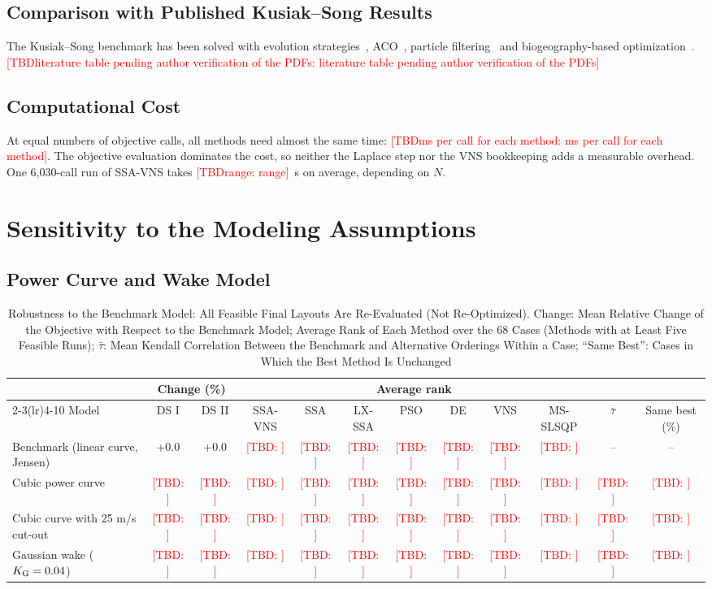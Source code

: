 \documentclass[journal,twoside]{IEEEtran}
\newcommand{\TBD}[1]{\textcolor{red}{[TBD\ifx\relax#1\relax\else: #1\fi]}}
\begin{document}
\subsection{Comparison with Published Kusiak--Song Results}
\label{sec:literature}
The Kusiak--Song benchmark has been solved with evolution strategies~\cite{Kusiak2010}, ACO~\cite{Eroglu2012}, particle filtering~\cite{Eroglu2013} and biogeography-based optimization~\cite{Bansal2017}. \TBD{literature table pending author verification of the PDFs}

\subsection{Computational Cost}
\label{sec:runtime}
At equal numbers of objective calls, all methods need almost the same time: \TBD{ms per call for each method}. The objective evaluation dominates the cost, so neither the Laplace step nor the VNS bookkeeping adds a measurable overhead. One 6,030-call run of SSA-VNS takes \TBD{range}~s on average, depending on $N$.

\section{Sensitivity to the Modeling Assumptions}
\label{sec:robustness}
\subsection{Power Curve and Wake Model}
\label{sec:powercurve}
\label{sec:gaussian}
\begin{table}[!t]
\centering
\caption{Robustness to the Benchmark Model: All Feasible Final Layouts Are Re-Evaluated (Not Re-Optimized). Change: Mean Relative Change of the Objective with Respect to the Benchmark Model; Average Rank of Each Method over the 68 Cases (Methods with at Least Five Feasible Runs); $\bar\tau$: Mean Kendall Correlation Between the Benchmark and Alternative Orderings Within a Case; ``Same Best'': Cases in Which the Best Method Is Unchanged}
\label{tab:robust-final}
\scriptsize\setlength{\tabcolsep}{3pt}
\begin{tabular}{lccccccccccc}
\toprule
& \multicolumn{2}{c}{Change (\%)} & \multicolumn{7}{c}{Average rank} & & \\
\cmidrule(lr){2-3}\cmidrule(lr){4-10}
Model & DS I & DS II & SSA-VNS & SSA & LX-SSA & PSO & DE & VNS & MS-SLSQP & $\bar\tau$ & Same best (\%) \\
\midrule
Benchmark (linear curve, Jensen) & +0.0 & +0.0 & \TBD{} & \TBD{} & \TBD{} & \TBD{} & \TBD{} & \TBD{} & \TBD{} & -- & -- \\
Cubic power curve & \TBD{} & \TBD{} & \TBD{} & \TBD{} & \TBD{} & \TBD{} & \TBD{} & \TBD{} & \TBD{} & \TBD{} & \TBD{} \\
Cubic curve with 25 m/s cut-out & \TBD{} & \TBD{} & \TBD{} & \TBD{} & \TBD{} & \TBD{} & \TBD{} & \TBD{} & \TBD{} & \TBD{} & \TBD{} \\
Gaussian wake ($K_{\rm G}=0.04$) & \TBD{} & \TBD{} & \TBD{} & \TBD{} & \TBD{} & \TBD{} & \TBD{} & \TBD{} & \TBD{} & \TBD{} & \TBD{} \\
\bottomrule
\end{tabular}
\end{table}
\end{document}
